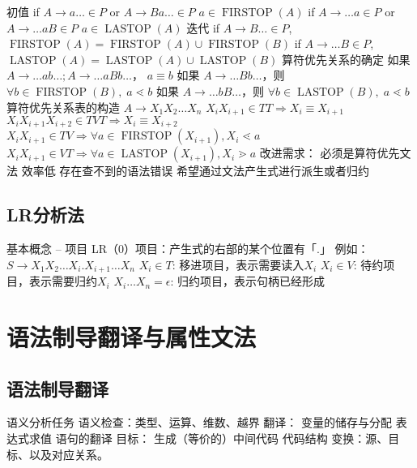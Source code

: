 \documentclass[oneside]{ctexbook}
\DeclareMathOperator{\firstop}{FIRSTOP}
\DeclareMathOperator{\lastop}{LASTOP}
\newcommand*{\tto}[0]{\Rightarrow}
\begin{document}
\begin{outline}
        \2 初值
            \3 if $A \to a \dots \in P$ or $ A \to Ba \dots \in P$
                \4 $a \in \firstop(A)$
            \3 if $A \to \dots a \in P$ or $ A \to  \dots aB \in P$
                \4 $a \in \lastop(A)$
        \2 迭代
            \3 if $A \to B \dots \in P$, $\firstop(A) = \firstop(A) \cup \firstop(B)$
            \3 if $A \to \dots B  \in P$, $\lastop(A) = \lastop(A) \cup \lastop(B)$
    \1 算符优先关系的确定
        \2 如果 $ A \to \dots ab \dots ; A \to \dots aBb \dots$， $a \equiv b$
        \2 如果 $A \to \dots Bb \dots$，则 $\forall b \in \firstop(B),\; a \lessdot b$
        \2 如果 $A \to \dots bB \dots$，则 $\forall b \in \lastop(B),\; a \lessdot b$
    \1 算符优先关系表的构造
        \2 $A \to X_1X_2\dots X_n$
            \3 $X_i X_{i+1} \in TT \tto X_i \equiv X_{i+1}$
            \3 $X_i X_{i+1}X_{i+2} \in TVT \tto X_i \equiv X_{i+2}$
            \3 $X_i X_{i+1} \in TV \tto \forall a \in \firstop(X_{i+1}), X_i \lessdot a$
            \3 $X_i X_{i+1} \in VT \tto \forall a \in \lastop(X_{i+1}), X_i \gtrdot a$
    \1 改进需求：
        \2 必须是算符优先文法
        \2 效率低
        \2 存在查不到的语法错误
        \2 希望通过文法产生式进行派生或者归约
\end{outline}
\section{LR分析法}
\begin{outline}
    \1 基本概念 -- 项目
        \2 LR（0）项目：产生式的右部的某个位置有「.」
        \2 例如： $S \to X_1X_2\dots X_i . X_{i+1} \dots X_n$
        \2 $X_i \in T$: 移进项目，表示需要读入$X_i$
        \2 $X_i \in V$: 待约项目，表示需要归约$X_i$
        \2 $X_i \dots X_n = \epsilon$: 归约项目，表示句柄已经形成

    
\end{outline}


\chapter{语法制导翻译与属性文法}
\section{语法制导翻译}
\begin{outline}
    \1 语义分析任务
        \2 语义检查：类型、运算、维数、越界
        \2 翻译：
            \3 变量的储存与分配
            \3 表达式求值
            \3 语句的翻译
        \2 目标：
            \3 生成（等价的）中间代码
    \1 代码结构
        \2 变换：源、目标、以及对应关系。
\end{outline}
\end{document}
